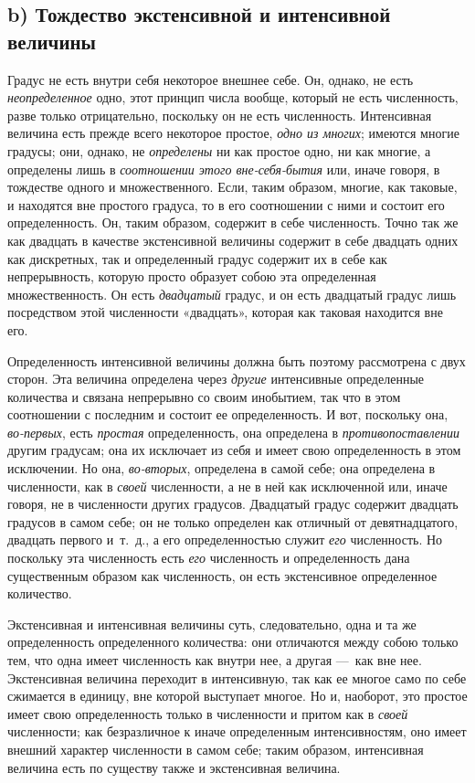\subsection[b) Тождество экстенсивной и интенсивной величины]{b) Тождество экстенсивной и интенсивной величины}

Градус не есть внутри себя некоторое внешнее себе. Он, однако, не есть
{\em неопределенное} одно, этот принцип числа вообще,
который не есть численность, разве только отрицательно, поскольку он не
есть численность. Интенсивная величина есть прежде всего некоторое простое,
{\em одно из многих}; имеются многие градусы; они,
однако, не {\em определены} ни как простое одно, ни как
многие, а определены лишь в {\em соотношении этого
вне-себя-бытия} или, иначе говоря, в тождестве одного и множественного.
Если, таким образом, многие, как таковые, и находятся вне простого градуса,
то в его соотношении с ними и состоит его определенность. Он, таким
образом, содержит в себе численность. Точно так же как двадцать в качестве
экстенсивной величины содержит в себе двадцать одних как дискретных, так и
определенный градус содержит их в себе как непрерывность, которую просто
образует собою эта определенная множественность. Он есть
{\em двадцатый} градус, и он есть двадцатый градус лишь
посредством этой численности «двадцать», которая как таковая находится вне
его.

Определенность интенсивной величины должна быть поэтому рассмотрена с двух
сторон. Эта величина определена через {\em другие}
интенсивные определенные количества и связана непрерывно со своим
инобытием, так что в этом соотношении с последним и состоит ее
определенность. И вот, поскольку она, {\em во-первых},
есть {\em простая} определенность, она определена в
{\em противопоставлении} другим градусам; она их
исключает из себя и имеет свою определенность в этом исключении. Но она,
{\em во-вторых}, определена в самой себе; она
определена в численности, как в {\em своей}
численности, а не в ней как исключенной или, иначе говоря, не в численности
других градусов. Двадцатый градус содержит двадцать градусов в самом себе;
он не только определен как отличный от девятнадцатого, двадцать первого
и~т.~д., а его определенностью служит {\em его}
численность. Но поскольку эта численность есть
{\em его} численность и определенность дана
существенным образом как численность, он есть экстенсивное определенное
количество.

Экстенсивная и интенсивная величины суть, следовательно, одна и та же
определенность определенного количества: они отличаются между собою только
тем, что одна имеет численность как внутри нее, а другая —~как вне нее.
Экстенсивная величина переходит в интенсивную, так как ее многое само по
себе сжимается в единицу, вне которой выступает многое. Но и, наоборот, это
простое имеет свою определенность только в численности и притом как в
{\em своей} численности; как безразличное к иначе
определенным интенсивностям, оно имеет внешний характер численности в самом
себе; таким образом, интенсивная величина есть по существу также и
экстенсивная величина.

